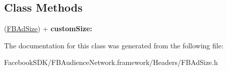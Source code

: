 \subsection*{Class Methods}
\begin{DoxyCompactItemize}
\item 
\hypertarget{interface_f_b_ad_custom_size_a42f4408b8dec323732c6d71559d18337}{(\hyperlink{struct_f_b_ad_size}{F\-B\-Ad\-Size}) + {\bfseries custom\-Size\-:}}\label{interface_f_b_ad_custom_size_a42f4408b8dec323732c6d71559d18337}

\end{DoxyCompactItemize}


The documentation for this class was generated from the following file\-:\begin{DoxyCompactItemize}
\item 
Facebook\-S\-D\-K/\-F\-B\-Audience\-Network.\-framework/\-Headers/F\-B\-Ad\-Size.\-h\end{DoxyCompactItemize}
